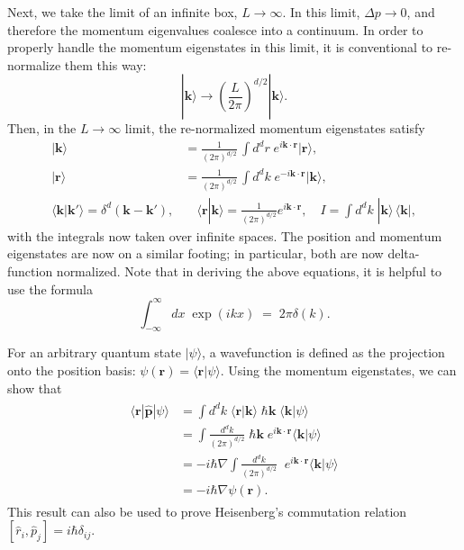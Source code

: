 \documentclass[pra,12pt]{revtex4}
\begin{document}
Next, we take the limit of an infinite box, $L \rightarrow \infty$.
In this limit, $\Delta p \rightarrow 0$, and therefore the momentum
eigenvalues coalesce into a continuum.  In order to properly handle
the momentum eigenstates in this limit, it is conventional to
re-normalize them this way:
\begin{equation}
  |\mathbf{k}\rangle \rightarrow \left(\frac{L}{2\pi}\right)^{d/2} |\mathbf{k}\rangle.
\end{equation}
Then, in the $L\rightarrow\infty$ limit, the re-normalized momentum
eigenstates satisfy
$$\boxed{\begin{aligned} |\mathbf{k}\rangle &= \frac{1}{(2\pi)^{d/2}} \, \int d^dr \; e^{i\mathbf{k}\cdot\mathbf{r}} |\mathbf{r}\rangle, \\ |\mathbf{r}\rangle &= \frac{1}{(2\pi)^{d/2}} \, \int d^dk \; e^{-i\mathbf{k}\cdot\mathbf{r}} |\mathbf{k}\rangle, \\\langle\mathbf{k}|\mathbf{k}'\rangle = \delta^d(\mathbf{k}-\mathbf{k}'),& \quad \langle\mathbf{r}|\mathbf{k}\rangle = \frac{1}{(2\pi)^{d/2}} e^{i\mathbf{k}\cdot\mathbf{r}}, \quad I = \int d^dk \;|\mathbf{k}\rangle\,\langle\mathbf{k}|,\end{aligned}}$$
with the integrals now taken over infinite spaces.  The position and
momentum eigenstates are now on a similar footing; in particular, both
are now delta-function normalized.  Note that in deriving the above
equations, it is helpful to use the formula
\begin{equation}
  \int_{-\infty}^\infty dx\; \exp(ikx) \;=\; 2\pi\delta(k).
\end{equation}

For an arbitrary quantum state $|\psi\rangle$, a wavefunction is
defined as the projection onto the position basis: $\psi(\mathbf{r}) =
\langle \mathbf{r}|\psi\rangle$.  Using the momentum eigenstates, we can
show that
\begin{align}
  \begin{aligned}\langle \mathbf{r}|\hat{\mathbf{p}}|\psi\rangle &=  \int d^dk \; \langle\mathbf{r}|\mathbf{k}\rangle \; \hbar\mathbf{k} \; \langle\mathbf{k}|\psi\rangle \\ &=  \int \frac{d^dk}{(2\pi)^{d/2}}\; \hbar\mathbf{k} \;e^{i\mathbf{k}\cdot\mathbf{r}} \langle\mathbf{k}|\psi\rangle \\ &=  -i\hbar\nabla \int \frac{d^dk}{(2\pi)^{d/2}}\; \;e^{i\mathbf{k}\cdot\mathbf{r}} \langle\mathbf{k}|\psi\rangle \\ &= -i\hbar \nabla\psi(\mathbf{r}).\end{aligned}
\end{align}
This result can also be used to prove Heisenberg's commutation relation
$[\hat{r}_i, \hat{p}_j] = i\hbar\delta_{ij}$.
\end{document}
